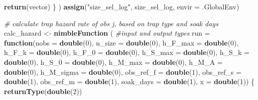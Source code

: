 \documentclass[
]{article}
\newenvironment{Shaded}{\begin{snugshade}}{\end{snugshade}}
\newcommand{\AttributeTok}[1]{\textcolor[rgb]{0.13,0.29,0.53}{#1}}
\newcommand{\CommentTok}[1]{\textcolor[rgb]{0.56,0.35,0.01}{\textit{#1}}}
\newcommand{\ControlFlowTok}[1]{\textcolor[rgb]{0.13,0.29,0.53}{\textbf{#1}}}
\newcommand{\DecValTok}[1]{\textcolor[rgb]{0.00,0.00,0.81}{#1}}
\newcommand{\FunctionTok}[1]{\textcolor[rgb]{0.13,0.29,0.53}{\textbf{#1}}}
\newcommand{\NormalTok}[1]{#1}
\newcommand{\OtherTok}[1]{\textcolor[rgb]{0.56,0.35,0.01}{#1}}
\newcommand{\StringTok}[1]{\textcolor[rgb]{0.31,0.60,0.02}{#1}}
\begin{document}
\begin{Shaded}
\begin{Highlighting}[]
      \FunctionTok{return}\NormalTok{(vector)}
\NormalTok{    \}}
\NormalTok{  )}
  \FunctionTok{assign}\NormalTok{(}\StringTok{"size\_sel\_log"}\NormalTok{, size\_sel\_log, }\AttributeTok{envir =}\NormalTok{ .GlobalEnv)}
  
  
  \CommentTok{\# calculate trap hazard rate of obs j, based on trap type and soak days}
\NormalTok{  calc\_hazard }\OtherTok{\textless{}{-}} \FunctionTok{nimbleFunction}\NormalTok{ (}
    \CommentTok{\#input and output types}
    \AttributeTok{run =} \ControlFlowTok{function}\NormalTok{(}\AttributeTok{nobs =} \FunctionTok{double}\NormalTok{(}\DecValTok{0}\NormalTok{), }\AttributeTok{n\_size =} \FunctionTok{double}\NormalTok{(}\DecValTok{0}\NormalTok{), }\AttributeTok{h\_F\_max =} \FunctionTok{double}\NormalTok{(}\DecValTok{0}\NormalTok{),}
                   \AttributeTok{h\_F\_k =} \FunctionTok{double}\NormalTok{(}\DecValTok{0}\NormalTok{), }\AttributeTok{h\_F\_0 =} \FunctionTok{double}\NormalTok{(}\DecValTok{0}\NormalTok{),}
                   \AttributeTok{h\_S\_max =} \FunctionTok{double}\NormalTok{(}\DecValTok{0}\NormalTok{), }\AttributeTok{h\_S\_k =} \FunctionTok{double}\NormalTok{(}\DecValTok{0}\NormalTok{),}
                   \AttributeTok{h\_S\_0 =} \FunctionTok{double}\NormalTok{(}\DecValTok{0}\NormalTok{), }\AttributeTok{h\_M\_max =} \FunctionTok{double}\NormalTok{(}\DecValTok{0}\NormalTok{),}
                   \AttributeTok{h\_M\_A =} \FunctionTok{double}\NormalTok{(}\DecValTok{0}\NormalTok{), }\AttributeTok{h\_M\_sigma =} \FunctionTok{double}\NormalTok{(}\DecValTok{0}\NormalTok{),}
                   \AttributeTok{obs\_ref\_f =} \FunctionTok{double}\NormalTok{(}\DecValTok{1}\NormalTok{), }\AttributeTok{obs\_ref\_s =} \FunctionTok{double}\NormalTok{(}\DecValTok{1}\NormalTok{),}
                   \AttributeTok{obs\_ref\_m =} \FunctionTok{double}\NormalTok{(}\DecValTok{1}\NormalTok{), }\AttributeTok{soak\_days =} \FunctionTok{double}\NormalTok{(}\DecValTok{1}\NormalTok{),}
                   \AttributeTok{x =} \FunctionTok{double}\NormalTok{(}\DecValTok{1}\NormalTok{))}
\NormalTok{    \{}
      \FunctionTok{returnType}\NormalTok{(}\FunctionTok{double}\NormalTok{(}\DecValTok{2}\NormalTok{))}
      

\end{Highlighting}
\end{Shaded}
\end{document}
